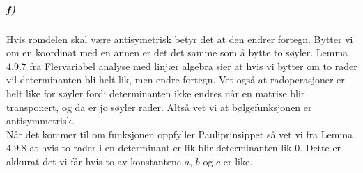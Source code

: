 \documentclass[11pt, A4paper,norsk]{article}
\begin{document}
			\subparagraph{f)}
				\begin{flushleft}
Hvis romdelen skal være antisymetrisk betyr det at den endrer fortegn. Bytter vi om en koordinat med en annen er det det samme som å bytte to søyler. Lemma $4.9.7$ fra Flervariabel analyse med linjær algebra sier at hvis vi bytter om to rader vil determinanten bli helt lik, men endre fortegn. Vet også at radoperasjoner er helt like for søyler fordi determinanten ikke endres når en matrise blir transponert, og da er jo søyler rader. Altså vet vi at bølgefunksjonen er antisymmetrisk. \\
Når det kommer til om funksjonen oppfyller Pauliprinsippet så vet vi fra Lemma $4.9.8$ at hvis to rader i en determinant er lik blir determinanten lik $0$. Dette er akkurat det vi får hvis to av konstantene $a$, $b$ og $c$ er like.
				\end{flushleft}
\end{document}
